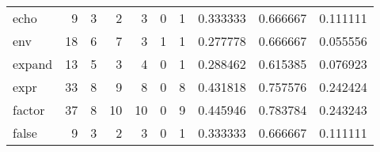 \begin{longtable}{lrrrrrrrrr}
echo      &                                       9 &                                                  3 &                                                  2 &                                                  3 &                                                  0 &                                                  1 &                                           0.333333 &                               0.666667 &                             0.111111 \\
env       &                                      18 &                                                  6 &                                                  7 &                                                  3 &                                                  1 &                                                  1 &                                           0.277778 &                               0.666667 &                             0.055556 \\
expand    &                                      13 &                                                  5 &                                                  3 &                                                  4 &                                                  0 &                                                  1 &                                           0.288462 &                               0.615385 &                             0.076923 \\
expr      &                                      33 &                                                  8 &                                                  9 &                                                  8 &                                                  0 &                                                  8 &                                           0.431818 &                               0.757576 &                             0.242424 \\
factor    &                                      37 &                                                  8 &                                                 10 &                                                 10 &                                                  0 &                                                  9 &                                           0.445946 &                               0.783784 &                             0.243243 \\
false     &                                       9 &                                                  3 &                                                  2 &                                                  3 &                                                  0 &                                                  1 &                                           0.333333 &                               0.666667 &                             0.111111 \\

\end{longtable}
